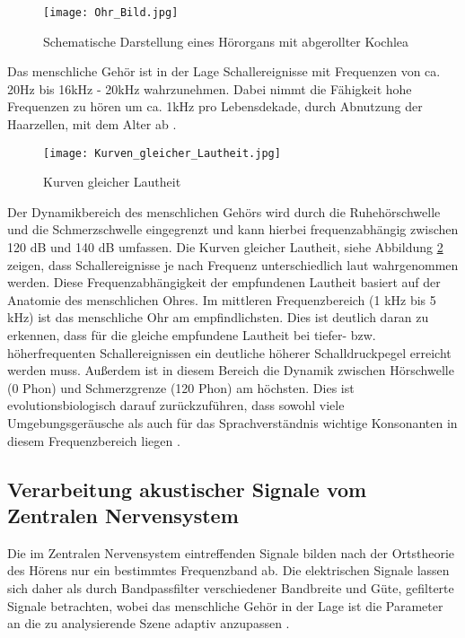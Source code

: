 \begin{figure}[H]
\centering
\texttt{[image: Ohr\_Bild.jpg]}
\caption{Schematische Darstellung eines Hörorgans mit abgerollter Kochlea}
\label{fig:Ohr_Bild}
\end{figure}


Das menschliche Gehör ist in der Lage Schallereignisse mit Frequenzen von ca. 20Hz bis 16kHz - 20kHz wahrzunehmen. Dabei nimmt die Fähigkeit hohe Frequenzen zu hören um ca. 1kHz pro Lebensdekade, durch Abnutzung der Haarzellen, mit dem Alter ab \cite[S.41]{Genuit10}.  \\

\begin{figure}[H]
\centering
\texttt{[image: Kurven\_gleicher\_Lautheit.jpg]}
\caption{Kurven gleicher Lautheit}
\label{fig:Kurven_gleicher_Lautheit}
\end{figure}

Der Dynamikbereich des menschlichen Gehörs wird durch die Ruhehörschwelle und die Schmerzschwelle eingegrenzt und kann hierbei frequenzabhängig zwischen 120 dB und 140 dB umfassen. Die Kurven gleicher Lautheit, siehe Abbildung \ref{fig:Kurven_gleicher_Lautheit} zeigen, dass Schallereignisse je nach Frequenz unterschiedlich laut wahrgenommen werden. Diese Frequenzabhängigkeit der empfundenen Lautheit basiert auf der Anatomie des menschlichen Ohres. Im mittleren Frequenzbereich (1 kHz bis 5 kHz) ist das menschliche Ohr am empfindlichsten. Dies ist deutlich daran zu erkennen, dass für die gleiche empfundene Lautheit bei tiefer- bzw. höherfrequenten Schallereignissen ein deutliche höherer Schalldruckpegel erreicht werden muss. Außerdem ist in diesem Bereich die Dynamik zwischen Hörschwelle (0 Phon) und Schmerzgrenze (120 Phon) am höchsten. Dies ist evolutionsbiologisch darauf zurückzuführen, dass sowohl viele Umgebungsgeräusche als auch für das Sprachverständnis wichtige Konsonanten in diesem Frequenzbereich liegen \cite[S.47]{HdA08}. 



\subsection{Verarbeitung akustischer Signale vom Zentralen Nervensystem}

Die im Zentralen Nervensystem eintreffenden Signale bilden nach der Ortstheorie des Hörens nur ein bestimmtes Frequenzband ab. Die elektrischen Signale lassen sich daher als durch Bandpassfilter verschiedener Bandbreite und Güte,  gefilterte Signale betrachten, wobei das menschliche Gehör in der Lage ist die Parameter an die zu analysierende Szene adaptiv anzupassen \cite[S.59]{Genuit10}. \\

